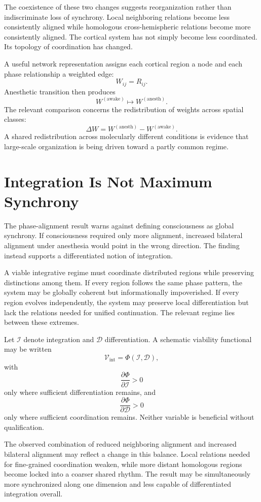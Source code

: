 \documentclass[11pt]{book}
\begin{document}
The coexistence of these two changes suggests reorganization rather than indiscriminate loss of synchrony. Local neighboring relations become less consistently aligned while homologous cross-hemispheric relations become more consistently aligned. The cortical system has not simply become less coordinated. Its topology of coordination has changed.

A useful network representation assigns each cortical region a node and each phase relationship a weighted edge:
\[
W_{ij}=R_{ij}.
\]
Anesthetic transition then produces
\[
W^{(\mathrm{awake})}
\longmapsto
W^{(\mathrm{anesth})}.
\]
The relevant comparison concerns the redistribution of weights across spatial classes:
\[
\Delta W
=
W^{(\mathrm{anesth})}
-
W^{(\mathrm{awake})}.
\]
A shared redistribution across molecularly different conditions is evidence that large-scale organization is being driven toward a partly common regime.

\section*{Integration Is Not Maximum Synchrony}

The phase-alignment result warns against defining consciousness as global synchrony. If consciousness required only more alignment, increased bilateral alignment under anesthesia would point in the wrong direction. The finding instead supports a differentiated notion of integration.

A viable integrative regime must coordinate distributed regions while preserving distinctions among them. If every region follows the same phase pattern, the system may be globally coherent but informationally impoverished. If every region evolves independently, the system may preserve local differentiation but lack the relations needed for unified continuation. The relevant regime lies between these extremes.

Let $\mathcal I$ denote integration and $\mathcal D$ differentiation. A schematic viability functional may be written
\[
\mathcal V_{\mathrm{int}}
=
\Phi(\mathcal I,\mathcal D),
\]
with
\[
\frac{\partial\Phi}{\partial\mathcal I}>0
\]
only where sufficient differentiation remains, and
\[
\frac{\partial\Phi}{\partial\mathcal D}>0
\]
only where sufficient coordination remains. Neither variable is beneficial without qualification.

The observed combination of reduced neighboring alignment and increased bilateral alignment may reflect a change in this balance. Local relations needed for fine-grained coordination weaken, while more distant homologous regions become locked into a coarser shared rhythm. The result may be simultaneously more synchronized along one dimension and less capable of differentiated integration overall.
\end{document}
